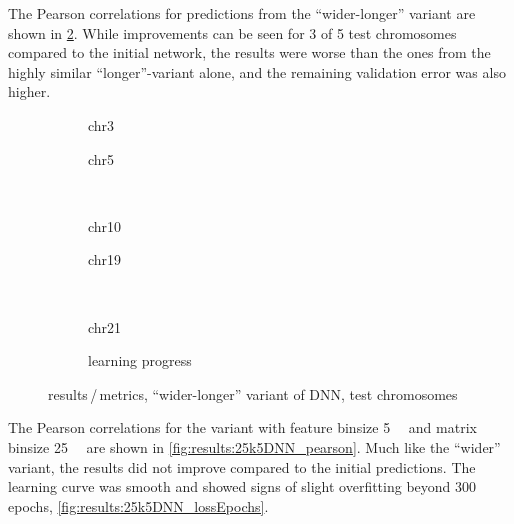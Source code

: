 The Pearson correlations for predictions from the ``wider-longer'' variant are shown in \cref{fig:results:wider-longerDNN_pearson}.
While improvements can be seen for 3 of 5 test chromosomes compared to the initial network, 
the results were worse than the ones from the highly similar ``longer''-variant alone,
and the remaining validation error was also higher.
\begin{figure}[p]
    \begin{subfigure}{0.45\textwidth}
        \scriptsize
        \caption{chr3}
    \end{subfigure} \hfill
    \begin{subfigure}{0.45\textwidth}
        \scriptsize
        \caption{chr5}
    \end{subfigure}\\[5mm]
    \begin{subfigure}{0.45\textwidth}
        \scriptsize
        \caption{chr10}
    \end{subfigure}\hfill
    \begin{subfigure}{0.45\textwidth}
        \scriptsize
        \caption{chr19}
    \end{subfigure}\\[3mm]
    \centering
    \begin{subfigure}{0.45\textwidth}
        \scriptsize
        \caption{chr21}
    \end{subfigure}\hfill
    \begin{subfigure}{0.45\textwidth}
        \caption{learning progress} \label{fig:results:wider-longerDNN_lossEpochs}
    \end{subfigure}
    \caption{results\,/\,metrics, ``wider-longer'' variant of DNN,  test chromosomes}
    \label{fig:results:wider-longerDNN_pearson}
\end{figure}

The Pearson correlations for the variant with feature binsize \SI{5}{\kilo\bp} and matrix binsize \SI{25}{\kilo\bp}
are shown in \cref{fig:results:25k5DNN_pearson}.
Much like the ``wider'' variant, the results did not improve compared to the initial predictions.
The learning curve was smooth and showed signs of slight overfitting beyond 300 epochs, \cref{fig:results:25k5DNN_lossEpochs}.

